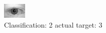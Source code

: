 \begin{figure}[h!]
\begin{center}
\includegraphics[width=0.60\columnwidth]{figures/ID670_class_2_target_3.png}
\end{center}
\caption{ Classification: 2 actual target: 3}
\label{fig:ID670_class_2_target_3}
\end{figure}
